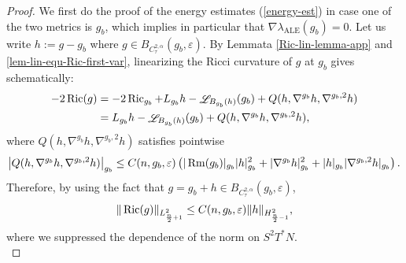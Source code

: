 \documentclass[a4paper,11pt,reqno]{amsart}
\def\Ric{\mathop{\rm Ric}\nolimits}
\def\Rm{\mathop{\rm Rm}\nolimits}
\def\Li{\mathop{\rm \mathscr{L}}\nolimits}
\def\Ric{\mathop{\rm Ric}\nolimits}
\def\Rm{\mathop{\rm Rm}\nolimits}
\def\Li{\mathop{\rm \mathscr{L}}\nolimits}
\numberwithin{equation}{section}
\begin{document}
\begin{proof}
		We first do the proof of the energy estimates (\ref{energy-est}) in case one of the two metrics is $g_b$, which implies in particular that $\nabla\lambda_{\operatorname{ALE}}(g_b)=0$.
		Let us write $h:=g-g_b$ where $g\in B_{C^{2,\alpha}_{\tau}}(g_b,\varepsilon)$. 
				By Lemmata \ref{Ric-lin-lemma-app} and \ref{lem-lin-equ-Ric-first-var}, linearizing the Ricci curvature of $g$ at $g_b$ gives schematically:
		\begin{equation}
		\begin{split}
		-2\Ric(g)&=-2\Ric_{g_b}+L_{g_b}h-\Li_{B_{g_b}(h)}(g_b)+Q(h,\nabla^{g_b}h,\nabla^{g_b,2}h)\\
		&=L_{g_b}h-\Li_{B_{g_b}(h)}(g_b)+Q(h,\nabla^{g_b}h,\nabla^{g_b,2}h),\label{ric-lin-bianchi}
		\end{split}
		\end{equation}
		where $Q(h,\nabla^{g_b}h,\nabla^{g_b,2}h)$ satisfies pointwise 
		\begin{equation*}
		\left|Q(h,\nabla^{g_b}h,\nabla^{g_b,2}h)\right|_{g_b}\leq C(n,g_b,\varepsilon)\left(|\Rm(g_b)|_{g_b}|h|^2_{g_b}+|\nabla^{g_b}h|_{g_b}^2+|h|_{g_b}|\nabla^{g_b,2}h|_{g_b}\right).
		\end{equation*}
		Therefore, by using the fact that $g=g_b+h\in B_{C^{2,\alpha}_{\tau}}(g_b,\varepsilon)$,
		\begin{eqnarray}
		\|\Ric(g)\|_{L^2_{\frac{n}{2}+1}}\leq C(n,g_b,\varepsilon)\|h\|_{H^2_{\frac{n}{2}-1}},\label{L^2-a-priori-bound-Ric}
		\end{eqnarray}
		where we suppressed the dependence of the norm on $S^2T^*N$.\\
		
		
		

\end{proof}
\end{document}
